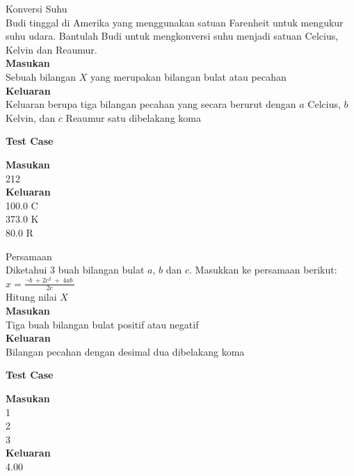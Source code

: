 \newpage
\begin{permasalahan}{Konversi Suhu}\\
\label{prob:KonversiSuhu}
Budi tinggal di Amerika yang menggunakan satuan  Farenheit untuk mengukur suhu udara. Bantulah Budi untuk mengkonversi suhu menjadi satuan Celcius, Kelvin dan Reaumur. \\ 
	\textbf{Masukan}\\
	Sebuah bilangan $X$ yang merupakan bilangan bulat atau pecahan\\
	\textbf{Keluaran}\\
Keluaran berupa tiga bilangan pecahan yang secara berurut dengan $a$ Celcius, $b$ Kelvin, dan $c$ Reaumur satu dibelakang koma
 	\begin{center}
	\textbf{Test Case}\\
	\end{center}
	\textbf{Masukan}\\
	212\\
	\textbf{Keluaran}\\
	100.0 C\\
	373.0 K\\
	80.0 R
\end{permasalahan}

\newpage
\begin{permasalahan}{Persamaan}\\
\label{prob:Persamaan}
Diketahui 3 buah bilangan bulat $a$, $b$ dan $c$. Masukkan ke persamaan berikut: \\
	
		 $x = \frac{\neg b\ +2c^{2}\ +\ 4ab\ }{2c}$ \\
	
Hitung nilai $X$ \\
	\textbf{Masukan}\\
	Tiga buah bilangan bulat positif atau negatif \\
	\textbf{Keluaran}\\
	Bilangan pecahan dengan desimal dua dibelakang koma \\
 	\begin{center}
	\textbf{Test Case}\\
	\end{center}
	\textbf{Masukan}\\
	1\\
	2\\
	3\\
	\textbf{Keluaran}\\
	4.00\\
\end{permasalahan}





